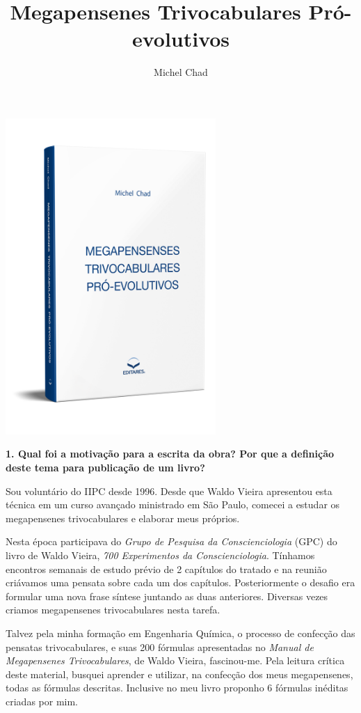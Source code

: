 \documentclass{gescons}
\author{Michel Chad}
\title{Megapensenes Trivocabulares Pró-evolutivos}
\begin{document}
    \makeentrevistatitle

    \begin{multicols}{2}



\begin{center}
    \includegraphics[width=8cm]{articles/entrevista/mockups/Michel-Chad.png}
\end{center}

\textbf{1.       Qual foi a motivação para a escrita da obra? Por que a definição deste tema para publicação de um livro?}

Sou voluntário do IIPC desde 1996. Desde que Waldo Vieira apresentou esta técnica em um curso avançado ministrado em São Paulo, comecei a estudar os megapensenes trivocabulares e elaborar meus próprios. 

Nesta época participava do \textit{Grupo de Pesquisa da Conscienciologia} (GPC) do livro de Waldo Vieira,  \textit{700 Experimentos da Conscienciologia}. Tínhamos encontros semanais de estudo prévio de 2 capítulos do tratado e na reunião criávamos uma pensata sobre cada um dos capítulos. Posteriormente o desafio era formular uma nova frase síntese juntando as duas anteriores. Diversas vezes criamos megapensenes trivocabulares nesta tarefa. 

Talvez pela minha formação em Engenharia Química, o processo de confecção das pensatas trivocabulares, e suas 200 fórmulas apresentadas no
\textit{Manual de Megapensenes Trivocabulares}, de Waldo Vieira,  fascinou-me. Pela leitura crítica deste material, busquei aprender e utilizar, na confecção dos meus megapensenes, todas as fórmulas descritas. Inclusive no meu livro proponho 6 fórmulas inéditas criadas por mim.


\end{multicols}
\end{document}
